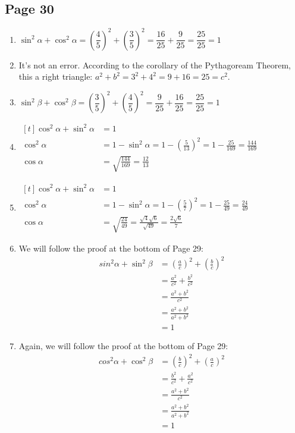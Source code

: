 \documentclass{article}
\newenvironment{solutions}[1]
{\subsection*{#1}
 \begin{enumerate}[leftmargin=1.5em]}
{\end{enumerate}}
\newcommand{\solution}{\item}
\begin{document}
\begin{solutions}{Page 30}
\solution %
$\sin^{2}{\alpha} + \cos^{2}{\alpha} = \left(\dfrac{4}{5}\right)^2 + \left(\dfrac{3}{5}\right)^2 = \dfrac{16}{25} + \dfrac{9}{25} = \dfrac{25}{25} = 1$

\solution %
It's not an error. According to the corollary of the Pythagoream Theorem, this a right triangle: $a^2 + b^2 = 3^2 + 4^2 = 9 + 16 = 25 = c^2$.

\solution %
$\sin^{2}{\beta} + \cos^{2}{\beta} = \left(\dfrac{3}{5}\right)^2 + \left(\dfrac{4}{5}\right)^2 = \dfrac{9}{25} + \dfrac{16}{25} = \dfrac{25}{25} = 1$

\solution %
$\begin{aligned}[t]
\cos^2{\alpha} + \sin^{2}{\alpha} &= 1 \\
\cos^2{\alpha} &= 1 - \sin^{2}{\alpha} = 1- \left(\frac{5}{13}\right)^2 = 1 - \frac{25}{169} = \frac{144}{169} \\
\cos{\alpha} &= \sqrt{\frac{144}{169}} = \frac{12}{13} 
\end{aligned}$

\solution %
$\begin{aligned}[t]
\cos^2{\alpha} + \sin^{2}{\alpha} &= 1 \\
\cos^2{\alpha} &= 1 - \sin^{2}{\alpha} = 1- \left(\frac{5}{7}\right)^2 = 1 - \frac{25}{49} = \frac{24}{49} \\
\cos{\alpha} &= \sqrt{\frac{24}{49}} = \frac{\sqrt{4}\sqrt{6}}{\sqrt{49}} = \frac{2\sqrt{6}}{7}
\end{aligned}$

\solution %
We will follow the proof at the bottom of Page 29:
\begin{align*}
sin^{2}{\alpha} + \sin^{2}{\beta} &= \left(\frac{a}{c}\right)^2 + \left(\frac{b}{c}\right)^2 \\
&= \frac{a^2}{c^2} + \frac{b^2}{c^2} \\
&= \frac{a^2 + b^2}{c^2} \\
&= \frac{a^2 + b^2}{a^2 + b^2} \\
&= 1
\end{align*}

\solution %
Again, we will follow the proof at the bottom of Page 29:
\begin{align*}
cos^{2}{\alpha} + \cos^{2}{\beta} &= \left(\frac{b}{c}\right)^2 + \left(\frac{a}{c}\right)^2 \\
&= \frac{b^2}{c^2} + \frac{a^2}{c^2} \\
&= \frac{a^2 + b^2}{c^2} \\
&= \frac{a^2 + b^2}{a^2 + b^2} \\
&= 1
\end{align*}
\end{solutions}
\end{document}
